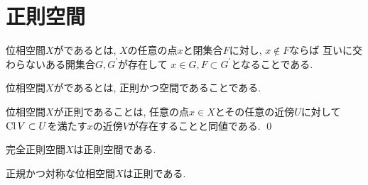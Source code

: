 \documentclass[uplatex, dvipdfmx, a4paper, 12pt, class=jsbook, crop=false]{standalone}
\begin{document}
\section{正則空間}
\label{sec:regular-spaces}

\begin{definition}
	位相空間$ X $がであるとは,
	$ X $の任意の点$ x $と閉集合$ F $に対し,
	$ x \not\in F $ならば
	互いに交わらないある開集合$ G, G^\prime $が存在して
	$ x \in G, F \subset G^\prime $となることである.
\end{definition}

\begin{definition}
	位相空間$ X $がであるとは,
	正則かつ空間であることである.
\end{definition}

\begin{proposition}
	\label{prop:A property equivalent to regularity}
	位相空間$ X $が正則であることは,
	任意の点$ x \in X $とその任意の近傍$ U $に対して
	$ \mathop{\mathrm{Cl}}\nolimits{V} \subset U $を満たす$ x $の近傍$ V $が存在することと同値である.
	\qed
\end{proposition}

\begin{proposition}
	完全正則空間$ X $は正則空間である.
\end{proposition}

\begin{proposition}
	正規かつ対称な位相空間$ X $は正則である.
\end{proposition}
\end{document}
